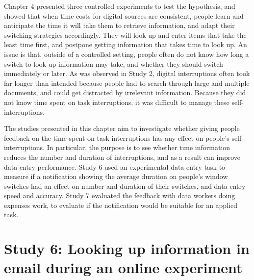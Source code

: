 Chapter 4 presented three controlled experiments to test the hypothesis, and showed that when time costs for digital sources are consistent, people learn and anticipate the time it will take them to retrieve information, and adapt their switching strategies accordingly. They will look up and enter items that take the least time first, and postpone getting information that takes time to look up. An issue is that, outside of a controlled setting, people often do not know how long a switch to look up information may take, and whether they should switch immediately or later. As was observed in Study 2, digital interruptions often took far longer than intended because people had to search through large and multiple documents, and could get distracted by irrelevant information. Because they did not know time spent on task interruptions, it was difficult to manage these self-interruptions. 

The studies presented in this chapter aim to investigate whether giving people feedback on the time spent on task interruptions has any effect on people's self-interruptions. In particular, the purpose is to see whether time information reduces the number and duration of interruptions, and as a result can improve data entry performance. Study 6 used an experimental data entry task to measure if a notification showing the average duration on people's window switches had an effect on number and duration of their switches, and data entry speed and accuracy. Study 7 evaluated the feedback with data workers doing expenses work, to evaluate if the notification would be suitable for an applied task.


\section{Study 6: Looking up information in email during an online experiment}

